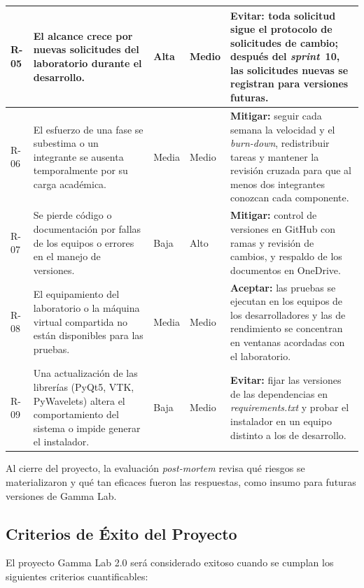 \documentclass{article}
\begin{document}
\begin{longtable}{|>{\raggedright\arraybackslash}p{1cm}|>{\raggedright\arraybackslash}p{4.4cm}|>{\raggedright\arraybackslash}p{1.3cm}|>{\raggedright\arraybackslash}p{1.3cm}|>{\raggedright\arraybackslash}p{5.8cm}|}
R-05 & El alcance crece por nuevas solicitudes del laboratorio durante el desarrollo. & Alta & Medio & \textbf{Evitar:} toda solicitud sigue el protocolo de solicitudes de cambio; después del \textit{sprint}~10, las solicitudes nuevas se registran para versiones futuras. \\
\hline

R-06 & El esfuerzo de una fase se subestima o un integrante se ausenta temporalmente por su carga académica. & Media & Medio & \textbf{Mitigar:} seguir cada semana la velocidad y el \textit{burn-down}, redistribuir tareas y mantener la revisión cruzada para que al menos dos integrantes conozcan cada componente. \\
\hline

R-07 & Se pierde código o documentación por fallas de los equipos o errores en el manejo de versiones. & Baja & Alto & \textbf{Mitigar:} control de versiones en GitHub con ramas y revisión de cambios, y respaldo de los documentos en OneDrive. \\
\hline

R-08 & El equipamiento del laboratorio o la máquina virtual compartida no están disponibles para las pruebas. & Media & Medio & \textbf{Aceptar:} las pruebas se ejecutan en los equipos de los desarrolladores y las de rendimiento se concentran en ventanas acordadas con el laboratorio. \\
\hline

R-09 & Una actualización de las librerías (PyQt5, VTK, PyWavelets) altera el comportamiento del sistema o impide generar el instalador. & Baja & Medio & \textbf{Evitar:} fijar las versiones de las dependencias en \textit{requirements.txt} y probar el instalador en un equipo distinto a los de desarrollo. \\
\hline
\end{longtable}

Al cierre del proyecto, la evaluación \textit{post-mortem} revisa qué riesgos se materializaron y qué tan eficaces fueron las respuestas, como insumo para futuras versiones de Gamma Lab.

\subsection{Criterios de Éxito del Proyecto}

El proyecto Gamma Lab 2.0 será considerado exitoso cuando se cumplan los siguientes criterios cuantificables:
\end{document}

